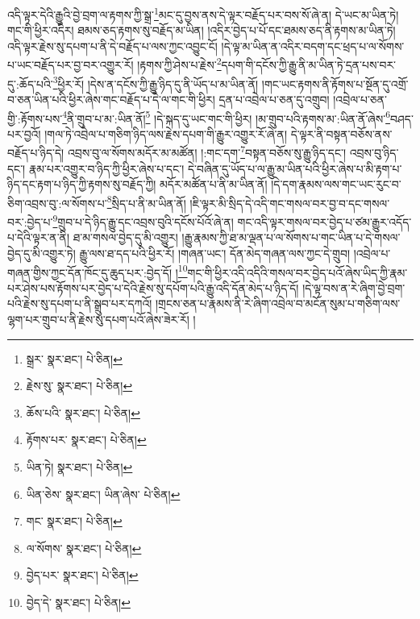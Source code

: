 འདི་ལྟར་དེའི་རྒྱུའི་བྱེ་བྲག་ལ་རྟགས་ཀྱི་སྒྲ་\footnote{སྒྲར་  སྣར་ཐང་།  པེ་ཅིན། }མང་དུ་བྱས་ནས་དེ་ལྟར་བརྗོད་པར་བས་སོ་ཞེ་ན། དེ་ཡང་མ་ཡིན་ཏེ། གང་གི་ཕྱིར་འདིར། ཐམས་ཅད་རྟགས་སུ་བརྗོད་མ་ཡིན། །འདིར་བྱེད་པ་པོ་དང་ཐམས་ཅད་ནི་རྟགས་མ་ཡིན་ཏེ། འདི་ལྟར་རྗེས་སུ་དཔག་པ་ནི་དེ་བརྗོད་པ་ལས་ཀྱང་འབྱུང་ངོ། །དེ་ལྟ་མ་ཡིན་ན་འདིར་བདག་དང་ཕྲད་པ་ལ་སོགས་པ་ཡང་བརྗོད་པར་བྱ་བར་འགྱུར་རོ། །རྟགས་ཀྱི་ཤེས་པ་རྗེས་\footnote{རྗེས་སུ་  སྣར་ཐང་།  པེ་ཅིན། }དཔག་གི་དངོས་ཀྱི་རྒྱུ་ནི་མ་ཡིན་ཏེ་དྲན་པས་བར་དུ་:ཆོད་པའི་\footnote{ཆོས་པའི་  སྣར་ཐང་།  པེ་ཅིན། }ཕྱིར་རོ། །དེས་ན་དངོས་ཀྱི་རྒྱུ་ཉིད་དུ་ནི་ཡོད་པ་མ་ཡིན་ནོ། །གང་ཡང་རྟགས་ནི་རྟོགས་པ་སྔོན་དུ་འགྲོ་བ་ཅན་ཡིན་པའི་ཕྱིར་ཞེས་གང་བརྗོད་པ་དེ་ལ་གང་གི་ཕྱིར། དྲན་པ་འབྲེལ་པ་ཅན་དུ་འགྲུབ། །འབྲེལ་པ་ཅན་གྱི་:རྟོགས་པས་\footnote{རྟོགས་པར་  སྣར་ཐང་།  པེ་ཅིན། }ནི་གྲུབ་པ་མ་:ཡིན་ནོ།\footnote{ཡིན་ཏེ།  སྣར་ཐང་།  པེ་ཅིན། } །དེ་སྐད་དུ་ཡང་གང་གི་ཕྱིར། །མ་གྲུབ་པའི་རྟགས་མ་:ཡིན་ནོ་ཞེས་\footnote{ཡིན་ཅེས་  སྣར་ཐང་། ཡིན་ཞེས་  པེ་ཅིན། }བཤད་པར་བྱའོ། །གལ་ཏེ་འབྲེལ་པ་གཅིག་ཉིད་ལས་རྗེས་དཔག་གི་རྒྱུར་འགྱུར་རོ་ཞེ་ན། དེ་ལྟར་ནི་བསྟན་བཅོས་ནས་བརྗོད་པ་ཉིད་དེ། འབྲས་བུ་ལ་སོགས་མདོར་མ་མཚོན། །:གང་དག་\footnote{གང་  སྣར་ཐང་།  པེ་ཅིན། }བསྟན་བཅོས་སུ་རྒྱུ་ཉིད་དང་། འབྲས་བུ་ཉིད་དང་། རྣམ་པར་འགྱུར་བ་ཉིད་ཀྱི་ཕྱིར་ཞེས་པ་དང་། དེ་བཞིན་དུ་ཡོད་པ་ལ་རྒྱུ་མ་ཡིན་པའི་ཕྱིར་ཞེས་པ་མི་རྟག་པ་ཉིད་དང་རྟག་པ་ཉིད་ཀྱི་རྟགས་སུ་བརྗོད་ཀྱི། མདོར་མཚོན་པ་ནི་མ་ཡིན་ནོ། །དེ་དག་རྣམས་ལས་གང་ཡང་རུང་བ་ཅིག་འབྲས་བུ་:ལ་སོགས་པ་\footnote{ལ་སོགས་  སྣར་ཐང་།  པེ་ཅིན། }སྲིད་པ་ནི་མ་ཡིན་ནོ། །ཇི་ལྟར་མི་སྲིད་དེ་འདི་གང་གསལ་བར་བྱ་བ་དང་གསལ་བར་:བྱེད་པ་\footnote{བྱེད་པར་  སྣར་ཐང་།  པེ་ཅིན། }གྲུབ་པ་དེ་ཉིད་རྒྱུ་དང་འབྲས་བུའི་དངོས་པོའོ་ཞེ་ན། གང་འདི་ལྟར་གསལ་བར་བྱེད་པ་ཙམ་རྒྱུར་འདོད་པ་དེའི་ལྟར་ན་ནི། ཐ་མ་གསལ་བྱེད་དུ་མི་འགྱུར། །རྒྱུ་རྣམས་ཀྱི་ཐ་མ་ལྡན་པ་ལ་སོགས་པ་གང་ཡིན་པ་དེ་གསལ་བྱེད་དུ་མི་འགྱུར་ཏེ། རྒྱུ་ལས་ཐ་དད་པའི་ཕྱིར་རོ། །གཞན་ཡང་། དོན་མེད་གཞན་ལས་ཀྱང་དེ་གྲུབ། །འབྲེལ་པ་གཞན་གྱིས་ཀྱང་དོན་ཁོང་དུ་ཆུད་པར་:བྱེད་དོ། །\footnote{བྱེད་དེ་  སྣར་ཐང་།  པེ་ཅིན། }གང་གི་ཕྱིར་འདི་འདིའི་གསལ་བར་བྱེད་པའོ་ཞེས་ཡིད་ཀྱི་རྣམ་པར་ཤེས་པས་རྟོགས་པར་བྱེད་པ་དེའི་རྗེས་སུ་དཔོག་པའི་རྒྱུ་འདི་དོན་མེད་པ་ཉིད་དོ། །དེ་ལྟ་བས་ན་རེ་ཞིག་བྱེ་བྲག་པའི་རྗེས་སུ་དཔག་པ་ནི་སྒྲུབ་པར་དཀའོ། །གྲངས་ཅན་པ་རྣམས་ནི་རེ་ཞིག་འབྲེལ་བ་མངོན་སུམ་པ་གཅིག་ལས་ལྷག་པར་གྲུབ་པ་ནི་རྗེས་སུ་དཔག་པའོ་ཞེས་ཟེར་རོ། །
